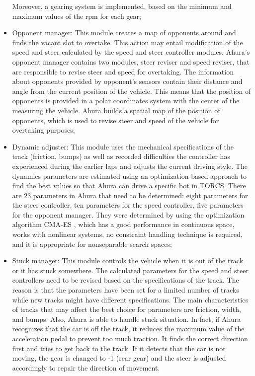 \begin{itemize}
Moreover, a gearing system is implemented, based on the minimum and maximum values of the rpm for each gear;
\item Opponent manager: This module creates a map of opponents around and finds the vacant slot to overtake. This action may entail modification of the speed and steer calculated by the speed and steer controller modules.
Ahura’s opponent manager contains two modules, steer reviser and speed reviser, that are responsible to revise steer and speed for overtaking. The information about opponents provided by opponent's sensors contain their distance and angle from the current position of the vehicle. This means that the position of opponents is provided in a polar coordinates system with the center of the measuring the vehicle. Ahura builds a spatial map of the position of opponents, which is used to revise steer and speed of the vehicle for overtaking purposes;
\item Dynamic adjuster: This module uses the mechanical specifications of the track (friction, bumps) as well as recorded difficulties the controller has experienced during the earlier laps and adjusts the current driving style.
The dynamics parameters are estimated using an optimization-based approach to find the best values so that Ahura can drive a specific bot in TORCS. There are 23 parameters in Ahura that need to be determined: eight parameters for the steer controller, ten parameters for the speed controller, five parameters for the opponent manager.
They were determined by using the optimization algorithm CMA-ES \cite{cmaes}, which has a good performance in continuous space, works with nonlinear systems, no constraint handling technique is required, and it is appropriate for nonseparable search spaces;
\item Stuck manager: This module controls the vehicle when it is out of the track or it has stuck somewhere.
The calculated parameters for the speed and steer controllers need to be revised based on the specifications of the track. The reason is that the parameters have been set for a limited number of tracks while new tracks might have different specifications. The main characteristics of tracks that may affect the best choice for parameters are friction, width, and bumps. Also, Ahura is able to handle stuck situation. In fact, if Ahura recognizes that the car is off the track, it reduces the maximum value of the acceleration pedal to prevent too much traction. It finds the correct direction first and tries to get back to the track. If it detects that the car is not moving, the gear is changed to -1 (rear gear) and the steer is adjusted accordingly to repair the direction of movement.
\end{itemize}


